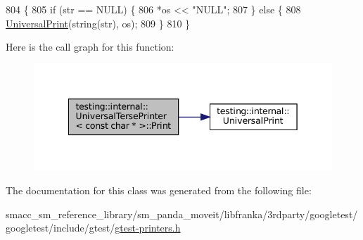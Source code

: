 \begin{DoxyCode}
804                                                      \{
805     \textcolor{keywordflow}{if} (str == NULL) \{
806       *os << \textcolor{stringliteral}{"NULL"};
807     \} \textcolor{keywordflow}{else} \{
808       \hyperlink{namespacetesting_1_1internal_a30708fa2bacf11895b03bdb21eb72309}{UniversalPrint}(\textcolor{keywordtype}{string}(str), os);
809     \}
810   \}
\end{DoxyCode}
Here is the call graph for this function\+:
\nopagebreak
\begin{figure}[H]
\begin{center}
\leavevmode
\includegraphics[width=342pt]{classtesting_1_1internal_1_1UniversalTersePrinter_3_01const_01char_01_5_01_4_a37a3be2d26dc07b24d16c2b5eb88ecda_cgraph}
\end{center}
\end{figure}


The documentation for this class was generated from the following file\+:\begin{DoxyCompactItemize}
\item 
smacc\+\_\+sm\+\_\+reference\+\_\+library/sm\+\_\+panda\+\_\+moveit/libfranka/3rdparty/googletest/googletest/include/gtest/\hyperlink{gtest-printers_8h}{gtest-\/printers.\+h}\end{DoxyCompactItemize}
